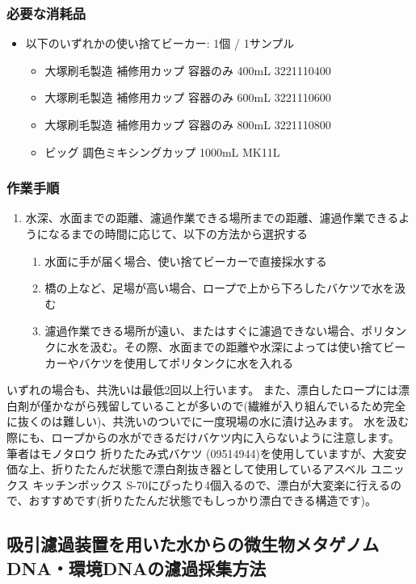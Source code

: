 \documentclass[titlepage,10pt,a4paper,uplatex]{jsbook}
\begin{document}
\subsubsection{必要な消耗品}
\begin{itemize}
\item 以下のいずれかの使い捨てビーカー: 1個 / 1サンプル
\begin{itemize}
\item 大塚刷毛製造 補修用カップ 容器のみ 400mL 3221110400
\item 大塚刷毛製造 補修用カップ 容器のみ 600mL 3221110600
\item 大塚刷毛製造 補修用カップ 容器のみ 800mL 3221110800
\item ビッグ 調色ミキシングカップ 1000mL MK11L
\end{itemize}
\end{itemize}

\subsubsection{作業手順}
\begin{enumerate}
\item 水深、水面までの距離、濾過作業できる場所までの距離、濾過作業できるようになるまでの時間に応じて、以下の方法から選択する
\begin{enumerate}
\item 水面に手が届く場合、使い捨てビーカーで直接採水する
\item 橋の上など、足場が高い場合、ロープで上から下ろしたバケツで水を汲む
\item 濾過作業できる場所が遠い、またはすぐに濾過できない場合、ポリタンクに水を汲む。その際、水面までの距離や水深によっては使い捨てビーカーやバケツを使用してポリタンクに水を入れる
\end{enumerate}
\end{enumerate}

いずれの場合も、共洗いは最低2回以上行います。
また、漂白したロープには漂白剤が僅かながら残留していることが多いので(繊維が入り組んでいるため完全に抜くのは難しい)、共洗いのついでに一度現場の水に漬け込みます。
水を汲む際にも、ロープからの水ができるだけバケツ内に入らないように注意します。
筆者はモノタロウ 折りたたみ式バケツ (09514944)を使用していますが、大変安価な上、折りたたんだ状態で漂白剤抜き器として使用しているアスベル ユニックス キッチンボックス S-70にぴったり4個入るので、漂白が大変楽に行えるので、おすすめです(折りたたんだ状態でもしっかり漂白できる構造です)。

\subsection{吸引濾過装置を用いた水からの微生物メタゲノムDNA・環境DNAの濾過採集方法}
\end{document}
